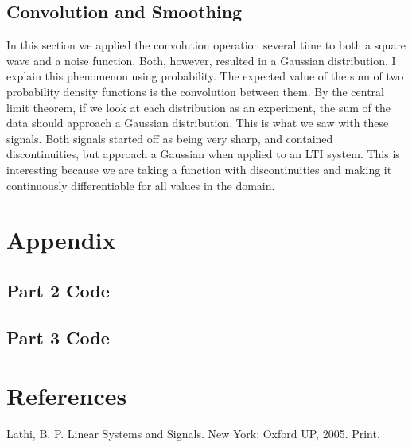 \documentclass{article}
\begin{document}
\subsection{Convolution and Smoothing}
In this section we applied the convolution operation several time to both a square wave and a noise function. Both, however, resulted in a Gaussian distribution. I explain this phenomenon using probability. The expected value of the sum of two probability density functions is the convolution between them. By the central limit theorem, if we look at each distribution as an experiment, the sum of the data should approach a Gaussian distribution. This is what we saw with these signals. Both signals started off as being very sharp, and contained discontinuities, but approach a Gaussian when applied to an LTI system. This is interesting because we are taking a function with discontinuities and making it continuously differentiable for all values in the domain. 
\section{Appendix}

\subsection{Part 2 Code}

\subsection{Part 3 Code}



\section{References}

Lathi, B. P. Linear Systems and Signals. New York: Oxford UP, 2005. Print.
\end{document}
